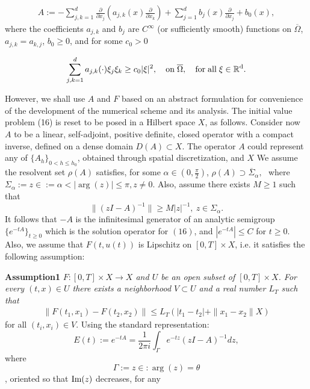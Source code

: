 \documentclass[12pt]{article}
\numberwithin{equation}{section} %
\begin{document}
\begin{eqnarray}
A := -\sum_{j,k=1}^d \frac{\partial}{\partial x_{j}} \left (
a_{j,k}(x)\frac{\partial}{\partial x_{k}} \right )+\sum_{j=1}^d
b_{j}(x)\frac{\partial}{\partial x_{j}}+b_{0}(x),
\end{eqnarray}
where the coefficients $a_{j,k}$ and $b_{j}$ are $C^{\infty}$ (or
sufficiently smooth) functions on $\overline{\Omega}$,
$a_{j,k}=a_{k,j}$, $b_{0} \ge 0$, and for some $c_0 > 0$

\begin{eqnarray}
\sum_{j,k=1}^d a_{j,k}(\cdot) \xi_{j} \xi_{k} \geq c_{0}
|\xi|^2,\quad \rm on \; \overline{\Omega}, \quad \rm{for\; all} \;
\xi \in  \mathbb{R}^{d}.
\end{eqnarray}


However, we shall use  $A$ and $F$ based on an abstract formulation
for convenience of the development of the numerical scheme and its
analysis. The initial value problem (16) is reset to be posed in a
Hilbert space ${X}$, as follows. Consider now $A$ to be a linear,
self-adjoint, positive definite, closed operator with a compact
inverse, defined on a dense domain $D(A) \subset {X}$.  The operator
$A$ could represent  any of $\{A_h\}_{0< h \le h_0}$, obtained
through spatial discretization, and  ${X}$ We assume the resolvent
set $\rho(A)$ satisfies, for some $\alpha \in (0,\frac{\pi}{2} )$,
$\rho(A) \supset \overline{\Sigma}_{\alpha}, \,\, $ where
$\Sigma_{\alpha}:= { z \in := \alpha < |\arg(z)| \leq \pi,z \neq
0}$. Also,  assume there exists $M \geq 1$ such that
\begin{equation}
\|(zI-A)^{-1}\| \geq M |z|^{-1}, \: z \in \Sigma_\alpha.
\end{equation}
It follows that $-A$ is the infinitesimal generator of an analytic
semigroup $\{e^{-tA}\}_{t\ge 0}$ which is the solution operator for
$(16)$, and $|e^{-tA}| \leq C$ for ${t \ge 0}$. Also, we assume that
$F(t,u(t))$ is Lipschitz on $[0,T] \times X$, i.e. it satisfies the
following assumption:

\textbf{Assumption1}
 \label{assumption2}
  \emph{ $F:[0,T] \times X
\rightarrow X$ and $U$ be an open subset of $[0,T] \times X$. For
every $(t,x) \in U$ there exists a neighborhood $V \subset U$ and a
real number $L_{T}$ such that}
\begin{eqnarray}
\|F(t_1,x_1) - F(t_2,x_2)\| \leq L_{T} ( |t_1-t_2| + \|x_1-x_2\|X)
\label{lipschitz}
\end{eqnarray}
for all $(t_i, x_i) \in V $. Using the standard representation:
\begin{equation*}
E(t) := e^{-tA} = \frac{1}{2\pi i}
\int_{\Gamma}e^{-tz}(zI-A)^{-1}dz, \label{Eq3}
 \end{equation*}
 where
 \begin{equation*}
 \Gamma := {z \in :\arg(z) = \theta}
 \end{equation*}
 , oriented so that
$\mbox{\rm Im}(z)$ decreases, for any
\end{document}

